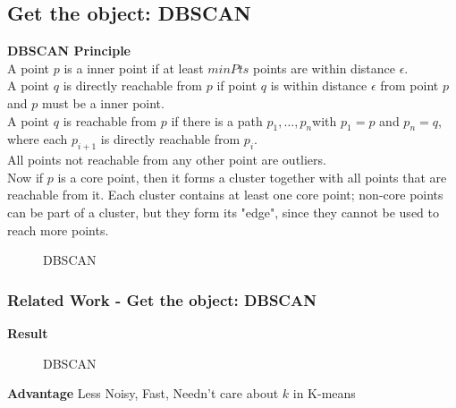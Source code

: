 \documentclass{beamer}
\begin{document}
\subsection{Get the object: DBSCAN}
\begin{frame}
\thispagestyle{empty}
\textbf{DBSCAN Principle}\\
\footnotesize
A point $p$ is a inner point if at least $minPts$ points are within distance $\epsilon$.\\
A point $q$ is directly reachable from $p$ if point $q$ is within distance $\epsilon$ from point $p$ and $p$ must be a inner point.\\
A point $q$ is reachable from $p$ if there is a path $p_1, \ldots, p_n $with $p_1 = p$ and $p_n = q$, where each $p_{i+1}$ is directly reachable from $p_i$.\\
All points not reachable from any other point are outliers.\\
Now if $p$ is a core point, then it forms a cluster together with all points that are reachable from it. Each cluster contains at least one core point; non-core points can be part of a cluster, but they form its "edge", since they cannot be used to reach more points.

\begin{figure}[H]
\centering
{}
\caption{DBSCAN}
\end{figure}

\end{frame}



\begin{frame}
\frametitle{Related Work - Get the object: DBSCAN}
\textbf{Result}
\begin{figure}[H]
\centering
{}
\caption{DBSCAN}
\end{figure}

\textbf{Advantage}
Less Noisy, Fast, Needn't care about $k$ in K-means
\end{frame}
\end{document}
